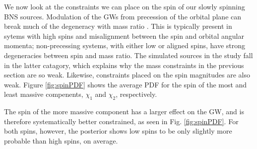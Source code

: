 We now look at the constraints we can place on the spin of our slowly spinning BNS sources.  Modulation of the GWs from precession of the orbital plane can break much of the degeneracy with mass ratio \citep{Vecchio_2004,Lang_2006,Chatziioannou_2014}. This is typically present in sytems with high spins and misalignment between the spin and orbital angular momenta; non-precessing systems, with either low or aligned spins, have strong degeneracies between spin and mass ratio.  The simulated sources in the study fall in the latter catagory, which explains why the mass constraints in the previous section are so weak.  Likewise, constraints placed on the spin magnitudes are also weak.  Figure \ref{fig:spinPDF} shows the average PDF for the spin of the most and least massive compenents, $\chi_1$ and $\chi_2$, respectively.

The spin of the more massive component has a larger effect on the GW, and is therefore systematically better constrained, as seen in Fig. \ref{fig:spinPDF}.  For both spins, however, the posterior shows low spins to be only slightly more probable than high spins, on average.